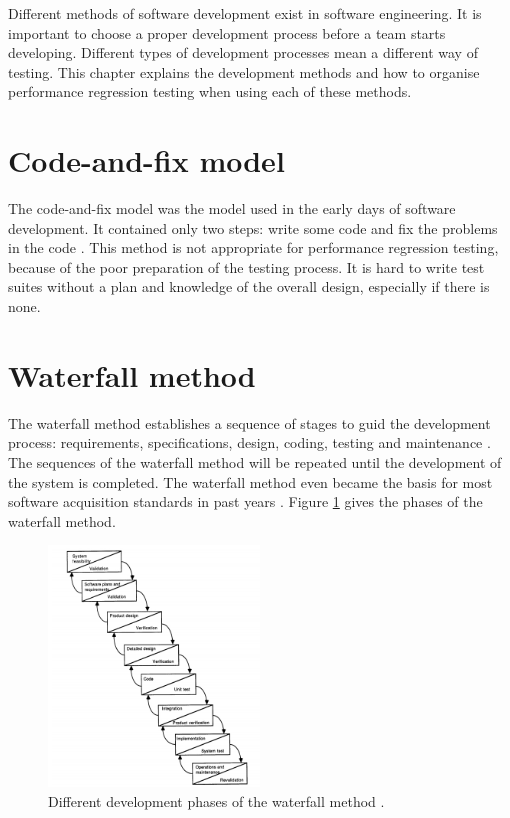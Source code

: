 Different methods of software development exist in software engineering. It is important to choose a proper development process before a team starts developing. Different types of development processes mean a different way of testing. This chapter explains the development methods and how to organise performance regression testing when using each of these methods.

\section{Code-and-fix model}
The code-and-fix model was the model used in the early days of software development. It contained only two steps: write some code and fix the problems in the code \cite{boehm1988spiral}. This method is not appropriate for performance regression testing, because of the poor preparation of the testing process. It is hard to write test suites without a plan and knowledge of the overall design, especially if there is none.

\section{Waterfall method}
The waterfall method establishes a sequence of stages to guid the development process: requirements, specifications, design, coding, testing and maintenance \cite{kang1989software}. The sequences of the waterfall method will be repeated until the development of the system is completed. The waterfall method even became the basis for most software acquisition standards in past years \cite{boehm1988spiral}. Figure \ref{Figure:Waterfall} gives the phases of the waterfall method.

\begin{figure}[H]
\label{Figure:Waterfall}
\begin{center}
  \includegraphics[width=0.5\textwidth]{Figures/waterfall.jpg}
\end{center}
  \caption{Different development phases of the waterfall method \cite{boehm1988spiral}.}
\end{figure}

